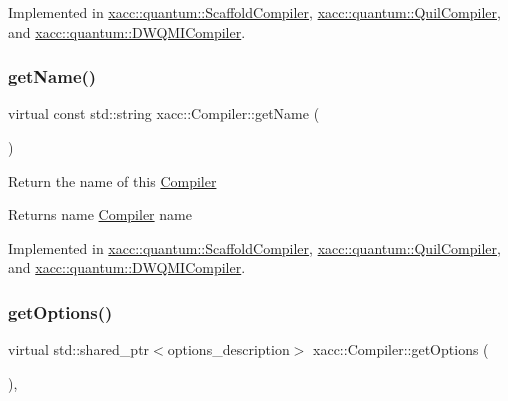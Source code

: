 Implemented in \hyperlink{a00951_a3736ecc229fe6acdd4c991e85d7a1f08}{xacc\+::quantum\+::\+Scaffold\+Compiler}, \hyperlink{a00931_adf4d321ecb0df3fa7728999f941c83b2}{xacc\+::quantum\+::\+Quil\+Compiler}, and \hyperlink{a00923_aa22591343b5509bf2c3a5820130ba906}{xacc\+::quantum\+::\+D\+W\+Q\+M\+I\+Compiler}.

\mbox{\label{a01127_a87fca9100e6462122f5b687c3a0fb3fb}} 
\subsubsection{\texorpdfstring{get\+Name()}{getName()}}
{\footnotesize\ttfamily virtual const std\+::string xacc\+::\+Compiler\+::get\+Name (\begin{DoxyParamCaption}{ }\end{DoxyParamCaption})\hspace{0.3cm}{\ttfamily [pure virtual]}}

Return the name of this \hyperlink{a01127}{Compiler} \begin{DoxyReturn}{Returns}
name \hyperlink{a01127}{Compiler} name 
\end{DoxyReturn}


Implemented in \hyperlink{a00951_a3f537054a3924a1d14f4ceb0f0181161}{xacc\+::quantum\+::\+Scaffold\+Compiler}, \hyperlink{a00931_ae7d52140b6dd52730edc6e38ae48f437}{xacc\+::quantum\+::\+Quil\+Compiler}, and \hyperlink{a00923_aed42de96f8e0dd94b6de183f28aee419}{xacc\+::quantum\+::\+D\+W\+Q\+M\+I\+Compiler}.

\mbox{\label{a01127_a9f5a8965c9c2dd895016d18264ebbe92}} 
\subsubsection{\texorpdfstring{get\+Options()}{getOptions()}}
{\footnotesize\ttfamily virtual std\+::shared\+\_\+ptr$<$options\+\_\+description$>$ xacc\+::\+Compiler\+::get\+Options (\begin{DoxyParamCaption}{ }\end{DoxyParamCaption})\hspace{0.3cm}{\ttfamily [inline]}, {\ttfamily [virtual]}}

